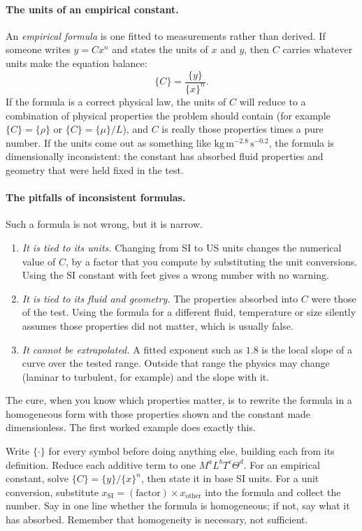 \paragraph{The units of an empirical constant.} An \emph{empirical formula} is one fitted to measurements rather than derived. If someone writes $y = C x^n$ and states the units of $x$ and $y$, then $C$ carries whatever units make the equation balance:
\[
\{C\} = \frac{\{y\}}{\{x\}^n}.
\]
If the formula is a correct physical law, the units of $C$ will reduce to a combination of physical properties the problem should contain (for example $\{C\} = \{\rho\}$ or $\{C\} = \{\mu\}/L$), and $C$ is really those properties times a pure number. If the units come out as something like $\mathrm{kg\,m^{-2.8}\,s^{-0.2}}$, the formula is dimensionally inconsistent: the constant has absorbed fluid properties and geometry that were held fixed in the test.

\paragraph{The pitfalls of inconsistent formulas.} Such a formula is not wrong, but it is narrow.
\begin{enumerate}[nosep,leftmargin=*]
\item \emph{It is tied to its units.} Changing from SI to US units changes the numerical value of $C$, by a factor that you compute by substituting the unit conversions. Using the SI constant with feet gives a wrong number with no warning.
\item \emph{It is tied to its fluid and geometry.} The properties absorbed into $C$ were those of the test. Using the formula for a different fluid, temperature or size silently assumes those properties did not matter, which is usually false.
\item \emph{It cannot be extrapolated.} A fitted exponent such as $1.8$ is the local slope of a curve over the tested range. Outside that range the physics may change (laminar to turbulent, for example) and the slope with it.
\end{enumerate}
The cure, when you know which properties matter, is to rewrite the formula in a homogeneous form with those properties shown and the constant made dimensionless. The first worked example does exactly this.

\begin{firstmoves}
Write $\{\cdot\}$ for every symbol before doing anything else, building each from its definition. Reduce each additive term to one $M^aL^bT^c\Theta^d$. For an empirical constant, solve $\{C\} = \{y\}/\{x\}^n$, then state it in base SI units. For a unit conversion, substitute $x_{\text{SI}} = (\text{factor}) \times x_{\text{other}}$ into the formula and collect the number. Say in one line whether the formula is homogeneous; if not, say what it has absorbed. Remember that homogeneity is necessary, not sufficient.
\end{firstmoves}

